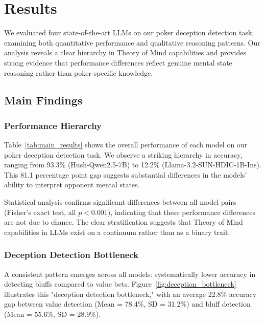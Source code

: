 \section{Results}
\label{sec:results}

We evaluated four state-of-the-art LLMs on our poker deception detection task, examining both quantitative performance and qualitative reasoning patterns. Our analysis reveals a clear hierarchy in Theory of Mind capabilities and provides strong evidence that performance differences reflect genuine mental state reasoning rather than poker-specific knowledge.

\subsection{Main Findings}
\label{subsec:main_findings}

\subsubsection{Performance Hierarchy}

Table~\ref{tab:main_results} shows the overall performance of each model on our poker deception detection task. We observe a striking hierarchy in accuracy, ranging from 93.3\% (Hush-Qwen2.5-7B) to 12.2\% (Llama-3.2-SUN-HDIC-1B-Ins). This 81.1 percentage point gap suggests substantial differences in the models' ability to interpret opponent mental states.



Statistical analysis confirms significant differences between all model pairs (Fisher's exact test, all $p < 0.001$), indicating that these performance differences are not due to chance. The clear stratification suggests that Theory of Mind capabilities in LLMs exist on a continuum rather than as a binary trait.

\subsubsection{Deception Detection Bottleneck}

A consistent pattern emerges across all models: systematically lower accuracy in detecting bluffs compared to value bets. Figure~\ref{fig:deception_bottleneck} illustrates this "deception detection bottleneck," with an average 22.8\% accuracy gap between value detection (Mean = 78.4\%, SD = 31.2\%) and bluff detection (Mean = 55.6\%, SD = 28.9\%).

